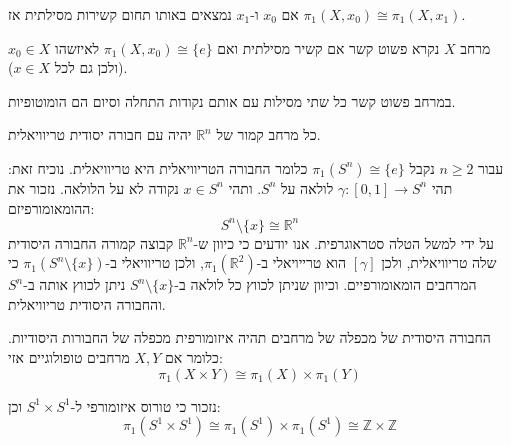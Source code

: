 \documentclass{tstextbook}
\begin{document}
\begin{corollary}
אם \(x_{0}\) ו-\(x_{1}\) נמצאים באותו תחום קשירות מסילתית אז  \(\pi_{1}(X,x_{0})\cong \pi_{1}(X,x_{1})\).

\end{corollary}
\begin{definition}
מרחב \(X\) נקרא פשוט קשר אם קשיר מסילתית ואם \(\pi_{1}(X,x_{0})\cong\{ e \}\) לאיזשהו \(x_{0} \in X\)(ולכן גם לכל \(x \in X\)).

\end{definition}
\begin{proposition}
במרחב פשוט קשר כל שתי מסילות עם אותם נקודות התחלה וסיום הם הומוטופיות.

\end{proposition}
\begin{example}
כל מרחב קמור של \(\mathbb{R}^{n}\) יהיה עם חבורה יסודית טריוויאלית.

\end{example}
\begin{example}
עבור \(n\geq 2\) נקבל \(\pi_{1}(S^{n})\cong \{ e \}\) כלומר החבורה הטריוויאלית היא טריוויאלית. נוכיח זאת:
תהי \(\gamma:[0,1]\to S^{n}\) לולאה על \(S^{n}\). ותהי \(x \in S^{n}\) נקודה לא על הלולאה. נזכור את ההומאומורפיזם:
$$S^{n}\setminus \{ x \}\cong \mathbb{R}^{n}$$
על ידי למשל הטלה סטראוגרפית. אנו יודעים כי כיוון ש-\(\mathbb{R}^{n}\) קבוצה קמורה החבורה היסודית שלה טריוויאלית, ולכן \(\left[ \gamma \right]\) הוא טרייויאלי ב-\(\pi_{1}\left( \mathbb{R}^{2} \right)\), ולכן טריוויאלי ב-\(\pi_{1}\left( S^{n}\setminus \{ x \} \right)\) כי המרחבים הומאומורפיים. וכיוון שניתן לכווץ כל לולאה ב-\(S^{n}\setminus \{ x \}\) ניתן לכווץ אותה ב-\(S^{n}\) והחבורה היסודית טריוויאלית.

\end{example}
\begin{proposition}
החבורה היסודית של מכפלה של מרחבים תהיה איזומורפית מכפלה של החבורות היסודיות. כלומר אם \(X,Y\) מרחבים טופולוגיים אזי:
$$\pi_{1}\left( X\times Y \right)\cong \pi_{1}(X)\times \pi_{1}(Y)$$

\end{proposition}
\begin{example}
נזכור כי טורוס איזומורפי ל-\(S^{1}\times S^{1}\) וכן:
$$\pi_{1}\left( S^{1}\times S^{1}\right)\cong \pi_{1}(S^{1})\times \pi_{1}(S^{1})\cong  \mathbb{Z}\times \mathbb{Z}$$

\end{example}
\end{document}
